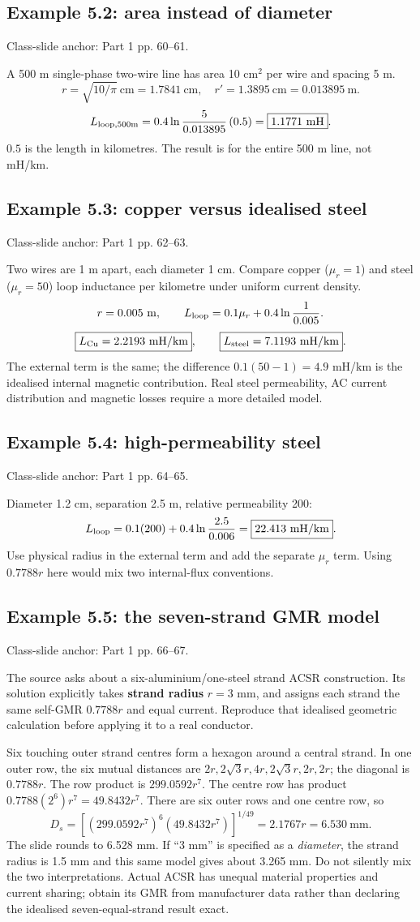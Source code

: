 \documentclass[11pt,a4paper]{article}
\newcommand{\slides}[1]{{\small\color{muted}\textsf{Class-slide anchor: #1.}}\par}
\newcommand{\ans}[1]{\boxed{#1}}
\begin{document}
\subsection{Example 5.2: area instead of diameter}
\slides{Part 1 pp. 60--61}
A 500 m single-phase two-wire line has area 10 cm$^2$ per wire and spacing 5 m.
\[
 r=\sqrt{10/\pi}\ \mathrm{cm}=1.7841\ \mathrm{cm},\quad
 r'=1.3895\ \mathrm{cm}=0.013895\ \mathrm m.
\]
\[
 L_{\rm loop,500m}=0.4\ln\frac5{0.013895}\,(0.5)
 =\ans{1.1771\ \mathrm{mH}}.
\]
$0.5$ is the length in kilometres. The result is for the entire 500 m line, not mH/km.
\subsection{Example 5.3: copper versus idealised steel}
\slides{Part 1 pp. 62--63}
Two wires are 1 m apart, each diameter 1 cm. Compare copper ($\mu_r=1$) and steel ($\mu_r=50$) loop inductance per kilometre under uniform current density.
\[
 r=0.005\ \mathrm m,\qquad L_{\rm loop}=0.1\mu_r+0.4\ln\frac1{0.005}.
\]
\[
 \ans{L_{\rm Cu}=2.2193\ \mathrm{mH/km}},\qquad
 \ans{L_{\rm steel}=7.1193\ \mathrm{mH/km}}.
\]
The external term is the same; the difference $0.1(50-1)=4.9$ mH/km is the idealised internal magnetic contribution. Real steel permeability, AC current distribution and magnetic losses require a more detailed model.
\subsection{Example 5.4: high-permeability steel}
\slides{Part 1 pp. 64--65}
Diameter 1.2 cm, separation 2.5 m, relative permeability 200:
\[
 L_{\rm loop}=0.1(200)+0.4\ln\frac{2.5}{0.006}
 =\ans{22.413\ \mathrm{mH/km}}.
\]
Use physical radius in the external term and add the separate $\mu_r$ term. Using $0.7788r$ here would mix two internal-flux conventions.
\subsection{Example 5.5: the seven-strand GMR model}
\slides{Part 1 pp. 66--67}
The source asks about a six-aluminium/one-steel strand ACSR construction. Its solution explicitly takes \textbf{strand radius} $r=3$ mm, and assigns each strand the same self-GMR $0.7788r$ and equal current. Reproduce that idealised geometric calculation before applying it to a real conductor.

Six touching outer strand centres form a hexagon around a central strand. In one outer row, the six mutual distances are $2r,2\sqrt3r,4r,2\sqrt3r,2r,2r$; the diagonal is $0.7788r$. The row product is $299.0592r^7$. The centre row has product $0.7788(2^6)r^7=49.8432r^7$. There are six outer rows and one centre row, so
\[
 D_s=\left[(299.0592r^7)^6(49.8432r^7)\right]^{1/49}
 =2.1767r=\ans{6.530\ \mathrm{mm}}.
\]
The slide rounds to 6.528 mm. If ``3 mm'' is specified as a \emph{diameter}, the strand radius is 1.5 mm and this same model gives about 3.265 mm. Do not silently mix the two interpretations. Actual ACSR has unequal material properties and current sharing; obtain its GMR from manufacturer data rather than declaring the idealised seven-equal-strand result exact.
\end{document}
